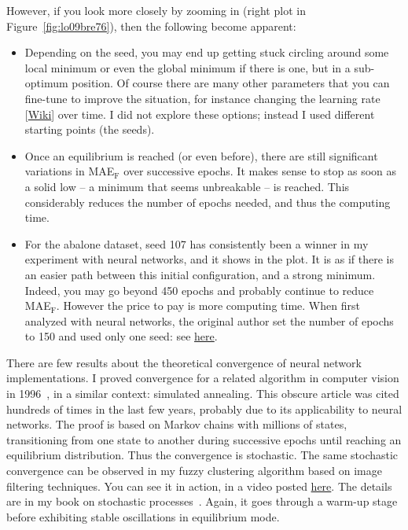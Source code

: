 \documentclass[oneside,10pt]{book}
\begin{document}
\noindent However, if you look more closely by zooming in (right plot in Figure~\ref{fig:lo09bre76}), then the following become apparent: \vspace{1ex}
\begin{itemize}
\item Depending on the seed, you may end up getting stuck circling around some local minimum or even the global minimum if there is one, but in a sub-optimum position. 
Of course there are many other parameters that you can fine-tune to improve the situation, for instance
 changing the \textcolor{index}{learning rate} [\href{https://en.wikipedia.org/wiki/Learning_rate}{Wiki}] over time. I did not explore these options; instead I used different starting points (the seeds).
\item Once an equilibrium is reached (or even before), there are still significant variations in MAE$_{\text{F}}$ over successive epochs. It makes sense to stop as soon as a solid low -- a minimum that seems unbreakable -- is reached. This considerably reduces the number of epochs needed, and thus the computing time. 
\item For the abalone dataset, seed 107 has consistently been a winner in my experiment with neural networks, and it shows in the plot. It is as if there is an easier path between this
 initial configuration, and a strong minimum. Indeed, you may go beyond 450 epochs and probably continue to reduce MAE$_{\text{F}}$. However the price to pay is more computing time. When first analyzed with neural networks, the original author set the number of epochs to 150 and used only one seed: 
see \href{https://machinelearningmastery.com/neural-network-models-for-combined-classification-and-regression/}{here}.
\end{itemize}\vspace{1ex}
There are few results about the theoretical convergence of neural network implementations. I proved convergence for a related algorithm in computer vision in 1996~\cite{vgieee}, in a similar context: simulated annealing. This obscure article was cited hundreds of times in the last few years, probably due to its applicability 
 to neural networks. The proof is based on Markov chains with millions of states, transitioning from one state to another during successive epochs until reaching an equilibrium distribution.
 Thus the convergence is stochastic. The same stochastic convergence can be observed in my fuzzy clustering algorithm based on image filtering techniques.
 You can see it in action, in a video posted \href{https://www.youtube.com/shorts/MKpQimCFfHA}{here}. The details are in my book on 
stochastic processes~\cite{vgsimulnew}. Again, it goes through a warm-up stage before exhibiting stable oscillations in equilibrium mode. 
\end{document}
